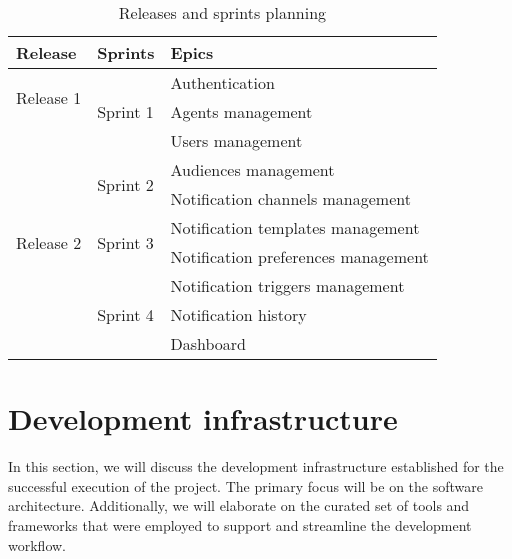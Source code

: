 \begin{table}[hbt!]
      \begin{tabular}{ | m{} | m{} | m{} | }
            \hline
            \textbf{Release}             & \textbf{Sprints}            & \textbf{Epics}                      \\
            \hline
            \multirow{2}{5em}{Release 1}
                                         & \multirow{3}{5em}{Sprint 1} & Authentication                      \\
            \cline{3-3}
                                         &                             & Agents management                   \\
            \cline{3-3}
                                         &                             & Users management                    \\
            \cline{2-3}

                                         & \multirow{2}{5em}{Sprint 2} & Audiences management                \\
            \cline{3-3}
                                         &                             & Notification channels management    \\
            \hline
            \multirow{2}{5em}{Release 2} & \multirow{2}{5em}{Sprint 3} & Notification templates management   \\
            \cline{3-3}
                                         &                             & Notification preferences management \\
            \cline{2-3}
                                         & \multirow{3}{5em}{Sprint 4} & Notification triggers management    \\
            \cline{3-3}
                                         &                             & Notification history                \\
            \cline{3-3}
                                         &                             & Dashboard                           \\
            \hline
      \end{tabular}
      \caption{Releases and sprints planning}
      \label{tab:planning}
\end{table}

\section{Development infrastructure}
In this section, we will discuss the development infrastructure established for the successful execution
of the project. The primary focus will be on the software architecture. Additionally, we will elaborate on the curated set of tools and frameworks that were employed to support
and streamline the development workflow.



